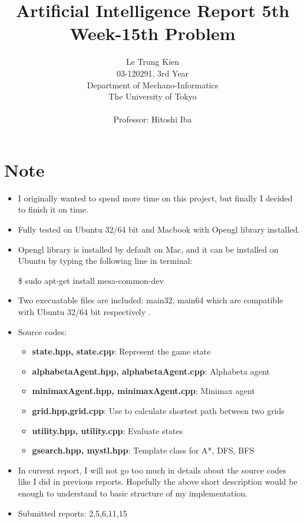 \documentclass[a4paper, 11pt]{article}
\begin{document}
\title{Artificial Intelligence Report 5th Week-15th Problem}
\author{Le Trung Kien\\ 
  03-120291, 3rd Year \\
  Department of Mechano-Informatics \\ 
  The University of Tokyo \\ \\
  Professor: Hitoshi Iba
}
\maketitle
\tableofcontents
\newpage
\section*{Note}
\begin{itemize}
\item I originally wanted to spend more time on this project, but finally I decided to finish it on time. 
\item Fully tested on Ubuntu 32/64 bit and Macbook with Opengl library installed.
\item Opengl library is installed by default on Mac, and it can be installed on Ubuntu by typing the following line in terminal: 
  \begin{center} \$ sudo apt-get install mesa-common-dev \end{center}
\item Two execuatable files are included: main32, main64 which are compatible with Ubuntu 32/64 bit respectively
  .
\item Source codes: 

  \begin{itemize}
  \item \textbf{state.hpp, state.cpp}: Represent the game state 
  \item \textbf{alphabetaAgent.hpp, alphabetaAgent.cpp}: Alphabeta agent 
  \item \textbf{minimaxAgent.hpp, minimaxAgent.cpp}: Minimax agent 
  \item \textbf{grid.hpp,grid.cpp}: Use to calculate shortest path between two grids
  \item \textbf{utility.hpp, utility.cpp}: Evaluate states
  \item \textbf{gsearch.hpp, mystl.hpp}: Template class for A*, DFS, BFS
  \end{itemize}
\item In current report, I will not go too much in details about the source codes like I did in previous reports. Hopefully the above short description would be enough to understand to basic structure of my implementation.
\item Submitted reports: 2,5,6,11,15
\end{itemize}
\end{document}
